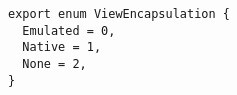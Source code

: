 \begin{verbatim}
export enum ViewEncapsulation {
  Emulated = 0,
  Native = 1,
  None = 2,
}
\end{verbatim}
